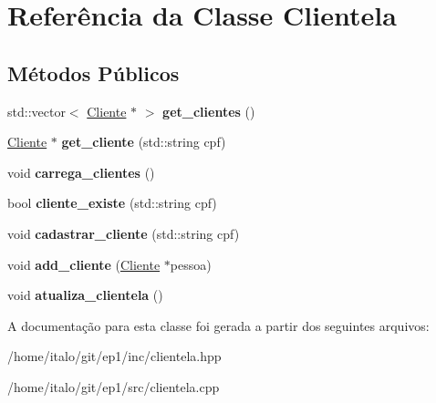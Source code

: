 \hypertarget{class_clientela}{}\section{Referência da Classe Clientela}
\label{class_clientela}
\subsection*{Métodos Públicos}
\begin{DoxyCompactItemize}
\item 
\mbox{\label{class_clientela_ac058383888ad0e9902f4ca864b24a7ef}} 
std\+::vector$<$ \hyperlink{class_cliente}{Cliente} $\ast$ $>$ {\bfseries get\+\_\+clientes} ()
\item 
\mbox{\label{class_clientela_a3fbafd57a0e87cc79355b4aa37e29b81}} 
\hyperlink{class_cliente}{Cliente} $\ast$ {\bfseries get\+\_\+cliente} (std\+::string cpf)
\item 
\mbox{\label{class_clientela_adfa1e93926a2423b2c36010f74a54dca}} 
void {\bfseries carrega\+\_\+clientes} ()
\item 
\mbox{\label{class_clientela_a2f2aae471f8b737a6bad97234d14577b}} 
bool {\bfseries cliente\+\_\+existe} (std\+::string cpf)
\item 
\mbox{\label{class_clientela_a1548d63a41bd54376abb8c6febd37eb7}} 
void {\bfseries cadastrar\+\_\+cliente} (std\+::string cpf)
\item 
\mbox{\label{class_clientela_ae726bfd284d8db4f25269ef0579cd761}} 
void {\bfseries add\+\_\+cliente} (\hyperlink{class_cliente}{Cliente} $\ast$pessoa)
\item 
\mbox{\label{class_clientela_a290fded8d0f603102d3e2ec530413754}} 
void {\bfseries atualiza\+\_\+clientela} ()
\end{DoxyCompactItemize}


A documentação para esta classe foi gerada a partir dos seguintes arquivos\+:\begin{DoxyCompactItemize}
\item 
/home/italo/git/ep1/inc/clientela.\+hpp\item 
/home/italo/git/ep1/src/clientela.\+cpp\end{DoxyCompactItemize}
